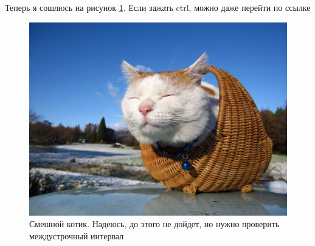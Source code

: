 Теперь я сошлюсь на рисунок \ref{fig:56376d9aa8d6b}. Если зажать ctrl, можно даже перейти по ссылке \cite{Chomsky1957}
\begin{figure}[hb]
	\centering
	\includegraphics[width=0.8\linewidth]{inc/img/56376d9aa8d6b}
	\caption{Смешной котик. Надеюсь, до этого не дойдет, но нужно проверить междустрочный интервал}
	\label{fig:56376d9aa8d6b}
\end{figure}
